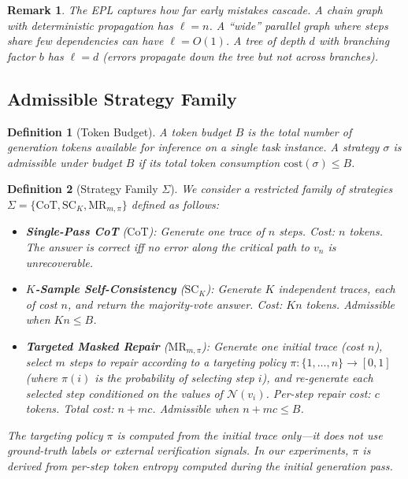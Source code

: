 \documentclass{article}
\newtheorem{definition}{Definition}
\newtheorem{remark}{Remark}
\begin{document}
\begin{remark}
The EPL captures how far early mistakes cascade. A chain graph with deterministic propagation has $\ell = n$. A ``wide'' parallel graph where steps share few dependencies can have $\ell = O(1)$. A tree of depth $d$ with branching factor $b$ has $\ell = d$ (errors propagate down the tree but not across branches).
\end{remark}

\subsection{Admissible Strategy Family}

\begin{definition}[Token Budget]
\label{def:budget}
A \emph{token budget} $B$ is the total number of generation tokens available for inference on a single task instance. A strategy $\sigma$ is \emph{admissible} under budget $B$ if its total token consumption $\text{cost}(\sigma) \leq B$.
\end{definition}

\begin{definition}[Strategy Family $\Sigma$]
\label{def:strategy}
We consider a restricted family of strategies $\Sigma = \{\text{CoT}, \text{SC}_K, \text{MR}_{m,\pi}\}$ defined as follows:
\begin{itemize}[nosep]
\item \textbf{Single-Pass CoT} ($\text{CoT}$): Generate one trace of $n$ steps. Cost: $n$ tokens. The answer is correct iff no error along the critical path to $v_n$ is unrecoverable.
\item \textbf{$K$-Sample Self-Consistency} ($\text{SC}_K$): Generate $K$ independent traces, each of cost $n$, and return the majority-vote answer. Cost: $Kn$ tokens. Admissible when $Kn \leq B$.
\item \textbf{Targeted Masked Repair} ($\text{MR}_{m,\pi}$): Generate one initial trace (cost $n$), select $m$ steps to repair according to a targeting policy $\pi: \{1,\ldots,n\} \to [0,1]$ (where $\pi(i)$ is the probability of selecting step $i$), and re-generate each selected step conditioned on the values of $\mathcal{N}(v_i)$. Per-step repair cost: $c$ tokens. Total cost: $n + mc$. Admissible when $n + mc \leq B$.
\end{itemize}
The targeting policy $\pi$ is computed from the \emph{initial trace only}---it does not use ground-truth labels or external verification signals. In our experiments, $\pi$ is derived from per-step token entropy computed during the initial generation pass.
\end{definition}
\end{document}
